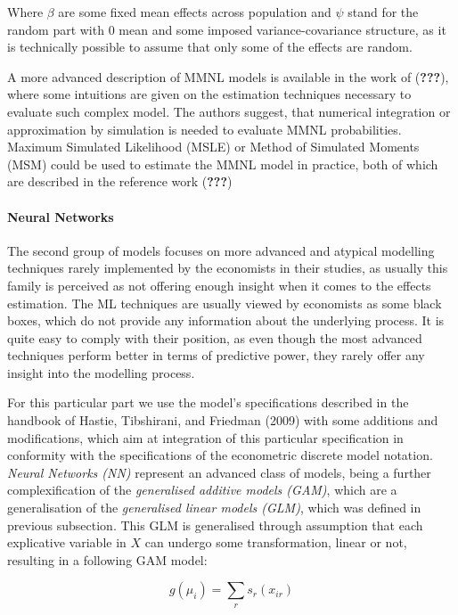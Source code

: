 \documentclass[11pt,]{article}
\let\oldparagraph\paragraph
\renewcommand{\paragraph}[1]{\oldparagraph{#1}\mbox{}}
\begin{document}
Where \(\beta\) are some fixed mean effects across population and
\(\psi\) stand for the random part with \(0\) mean and some imposed
variance-covariance structure, as it is technically possible to assume
that only some of the effects are random.

A more advanced description of MMNL models is available in the work of
({\textbf{???}}), where some intuitions are given on the estimation
techniques necessary to evaluate such complex model. The authors
suggest, that numerical integration or approximation by simulation is
needed to evaluate MMNL probabilities. Maximum Simulated Likelihood
(MSLE) or Method of Simulated Moments (MSM) could be used to estimate
the MMNL model in practice, both of which are described in the reference
work ({\textbf{???}})

\hypertarget{neural-networks}{%
\paragraph{Neural Networks}\label{neural-networks}}

The second group of models focuses on more advanced and atypical
modelling techniques rarely implemented by the economists in their
studies, as usually this family is perceived as not offering enough
insight when it comes to the effects estimation. The ML techniques are
usually viewed by economists as some black boxes, which do not provide
any information about the underlying process. It is quite easy to comply
with their position, as even though the most advanced techniques perform
better in terms of predictive power, they rarely offer any insight into
the modelling process.

For this particular part we use the model's specifications described in
the handbook of Hastie, Tibshirani, and Friedman (2009) with some
additions and modifications, which aim at integration of this particular
specification in conformity with the specifications of the econometric
discrete model notation. \emph{Neural Networks (NN)} represent an
advanced class of models, being a further complexification of the
\emph{generalised additive models (GAM)}, which are a generalisation of
the \emph{generalised linear models (GLM)}, which was defined in
previous subsection. This GLM is generalised through assumption that
each explicative variable in \(X\) can undergo some transformation,
linear or not, resulting in a following GAM model:

\begin{equation}
g(\mu_i) = \sum_r s_r(x_{ir})
\end{equation}
\end{document}
